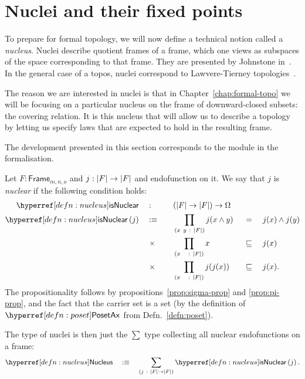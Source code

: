 \section{Nuclei and their fixed points}\label{sec:nuclei}

To prepare for formal topology, we will now define a technical notion called a
\emph{nucleus}. Nuclei describe quotient frames of a frame, which one views as subspaces
of the space corresponding to that frame. They are presented by Johnstone
in~\cite[Sec.~II.2]{stone-spaces}. In the general case of a topos, nuclei correspond to
Lawvere-Tierney topologies~\cite{nlab-nucleus}.

The reason we are interested in nuclei is that in Chapter~\ref{chap:formal-topo} we will
be focusing on a particular nucleus on the frame of downward-closed subsets: the covering
relation. It is this nucleus that will allow us to describe a topology by letting us
specify laws that are expected to hold in the resulting frame.

The development presented in this section corresponds to the  module
in the \veragda{} formalisation.

\begin{defn}[Nucleus]\label{defn:nucleus}
  Let $F : \mathsf{Frame}_{m, n, o}$ and $j : \left| F \right| \rightarrow \left| F \right|$ and endofunction on it.
  We say that $j$ is \emph{nuclear} if the following condition holds:
  \begin{alignat*}{4}
    \isnuclearnm{}\quad&:\quad &&(\abs{F} \rightarrow \abs{F}) \rightarrow \Omega && &&              \\
    \isnuclear{j} \quad&\is\quad
       &&\pity{x~y}{\abs{F}}{j(\meet{x}{y}) &&~=~ &&\meet{j(x)}{j(y)}}  \\
      &\hspace{0.3em}\times\quad &&\pity{x~~}{\abs{F}}{x &&~\sqsubseteq~ &&j(x)}           \\
      &\hspace{0.3em}\times\quad &&\pity{x~~}{\abs{F}}{j(j(x)) &&~\sqsubseteq~ &&j(x)}.
  \end{alignat*}
  The propositionality follows by propositions~\ref{prop:sigma-prop} and
  \ref{prop:pi-prop}, and the fact that the carrier set is a set (by the definition of
  $\posetaxnm{}$ from Defn.~\ref{defn:poset}).

  The type of nuclei is then just the $\sum$ type collecting all nuclear endofunctions on a
  frame:
  \begin{equation*}
    \nucleus{} \quad\is\quad \sigmaty{j}{\abs{F} \rightarrow \abs{F}}{\isnuclear{j}}.
  \end{equation*}
\end{defn}

